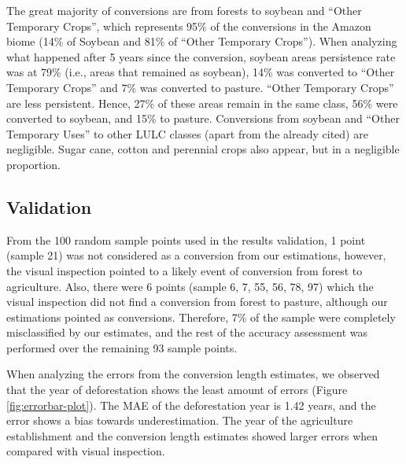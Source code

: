 \documentclass[essd, manuscript]{copernicus}
\begin{document}
The great majority of conversions are from forests to soybean and ``Other Temporary Crops'', which represents 95\% of the conversions in the Amazon biome (14\% of Soybean and 81\% of ``Other Temporary Crops'').
When analyzing what happened after 5 years since the conversion, soybean areas persistence rate was at 79\% (i.e., areas that remained as soybean), 14\% was converted to ``Other Temporary Crops'' and 7\% was converted to pasture.
``Other Temporary Crops'' are less persistent.
Hence, 27\% of these areas remain in the same class, 56\% were converted to soybean, and 15\% to pasture.
Conversions from soybean and ``Other Temporary Uses'' to other LULC classes (apart from the already cited) are negligible.
Sugar cane, cotton and perennial crops also appear, but in a negligible proportion.

\subsection{Validation}

From the 100 random sample points used in the results validation, 1 point (sample 21) was not considered as a conversion from our estimations, however, the visual inspection pointed to a likely event of conversion from forest to agriculture.
Also, there were 6 points (sample 6, 7, 55, 56, 78, 97) which the visual inspection did not find a conversion from forest to pasture, although our estimations pointed as conversions.
Therefore, 7\% of the sample were completely misclassified by our estimates, and the rest of the accuracy assessment was performed over the remaining 93 sample points.

When analyzing the errors from the conversion length estimates, we observed that the year of deforestation shows the least amount of errors (Figure \ref{fig:errorbar-plot}).
The MAE of the deforestation year is 1.42 years, and the error shows a bias towards underestimation.
The year of the agriculture establishment and the conversion length estimates showed larger errors when compared with visual inspection.
\end{document}
